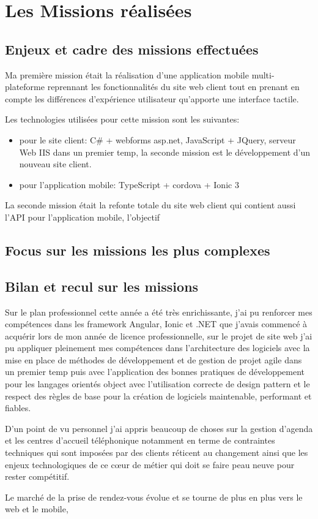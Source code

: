 \chapter{Les Missions réalisées}
\section{Enjeux et cadre des missions effectuées}
Ma première mission était la réalisation d'une application mobile multi-plateforme 
reprennant les fonctionnalités du site web client tout en prenant en compte 
les différences d'expérience utilisateur qu'apporte une interface tactile.\newline

Les technologies utilisées pour cette mission sont les suivantes:
\begin{itemize}
    \item pour le site client: C\# + webforms asp.net, JavaScript + JQuery, serveur Web IIS 
    dans un premier temp, la seconde mission est le développement d'un nouveau site client.
	\item pour l'application mobile: TypeScript + cordova + Ionic 3 \newline
\end{itemize} 

La seconde mission était la refonte totale du site web client qui contient aussi l'API pour 
l'application mobile, l'objectif 

\section{Focus sur les missions les plus complexes}


\newpage
\section{Bilan et recul sur les missions}

Sur le plan professionnel cette année a été très enrichissante, j'ai pu renforcer mes compétences dans 
les framework Angular, Ionic et .NET que j'avais commencé à acquérir lors de mon année de licence 
professionnelle, sur le projet de site web j'ai pu appliquer pleinement mes compétences 
dans l'architecture des logiciels avec la mise en place de méthodes de développement et 
de gestion de projet agile dans un premier temp puis avec l'application des bonnes pratiques 
de développement pour les langages orientés object avec l'utilisation correcte de design pattern
et le respect des règles de base pour la création de logiciels maintenable, performant et fiables.
\newline

D'un point de vu personnel j'ai appris beaucoup de choses sur la gestion d'agenda et les centres d'accueil téléphonique notamment
en terme de contraintes techniques qui sont imposées par des clients réticent au changement 
ainsi que les enjeux technologiques de ce cœur de métier qui doit se faire peau neuve 
pour rester compétitif.

Le marché de la prise de rendez-vous évolue et se tourne de plus en plus vers le 
web et le mobile, \newline
